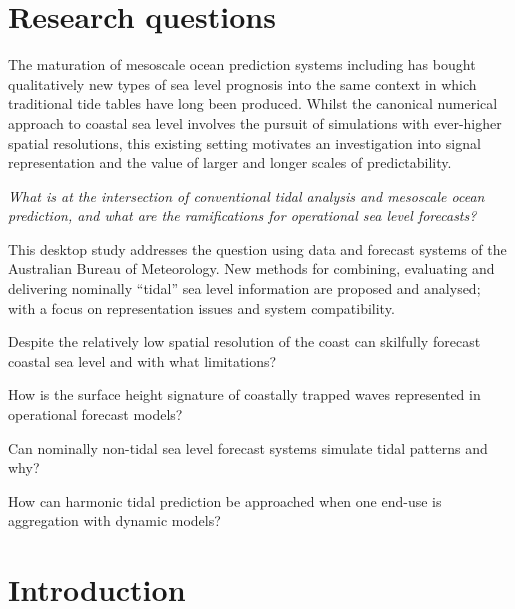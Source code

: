 \chapter{Research questions}

The maturation of mesoscale ocean prediction systems including \BL{} has bought qualitatively new types of sea level prognosis into the same context in which traditional tide tables have long been produced.
Whilst the canonical numerical approach to coastal sea level involves the pursuit of simulations with ever-higher spatial resolutions, this existing setting motivates an investigation into signal representation and the value of larger and longer scales of predictability.

\BoxBegin
\em{What is at the intersection of conventional tidal analysis and mesoscale ocean prediction, and what are the ramifications for operational sea level forecasts?}
\BoxEnd

This desktop study addresses the question using data and forecast systems of the Australian Bureau of Meteorology. New methods for combining, evaluating and delivering nominally “tidal” sea level information are proposed and analysed; with a focus on representation issues and system compatibility.


Despite the relatively low spatial resolution of the coast can \BL{} skilfully forecast coastal sea level and with what limitations? 

How is the surface height signature of coastally trapped waves represented in operational forecast models? 

Can nominally non-tidal sea level forecast systems simulate tidal patterns and why?


How can harmonic tidal prediction be approached when one end-use is aggregation with dynamic models?


\chapter{Introduction}











